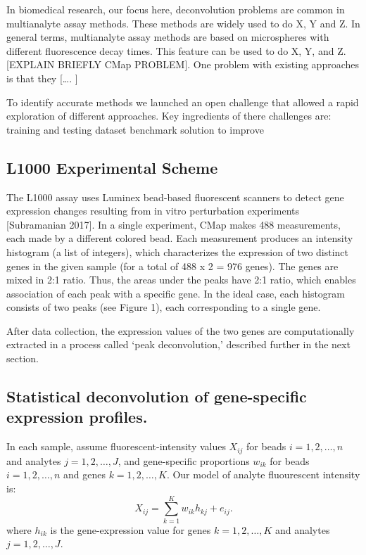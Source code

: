 \documentclass[]{article}
\begin{document}
In biomedical research, our focus here, deconvolution problems are
common in multianalyte assay methods. These methods are widely used to
do X, Y and Z. In general terms, multianalyte assay methods are based on
microspheres with different fluorescence decay times. This feature can
be used to do X, Y, and Z. {[}EXPLAIN BRIEFLY CMap PROBLEM{]}. One
problem with existing approaches is that they {[}\ldots. {]}

To identify accurate methods we launched an open challenge that allowed
a rapid exploration of different approaches. Key ingredients of there
challenges are: training and testing dataset benchmark solution to
improve

\hypertarget{l1000-experimental-scheme}{%
\subsection{L1000 Experimental Scheme}\label{l1000-experimental-scheme}}

The L1000 assay uses Luminex bead-based fluorescent scanners to detect
gene expression changes resulting from in vitro perturbation experiments
{[}Subramanian 2017{]}. In a single experiment, CMap makes 488
measurements, each made by a different colored bead. Each measurement
produces an intensity histogram (a list of integers), which
characterizes the expression of two distinct genes in the given sample
(for a total of 488 x 2 = 976 genes). The genes are mixed in 2:1 ratio.
Thus, the areas under the peaks have 2:1 ratio, which enables
association of each peak with a specific gene. In the ideal case, each
histogram consists of two peaks (see Figure 1), each corresponding to a
single gene.

After data collection, the expression values of the two genes are
computationally extracted in a process called `peak deconvolution,'
described further in the next section.

\hypertarget{statistical-deconvolution-of-gene-specific-expression-profiles.}{%
\subsection{Statistical deconvolution of gene-specific expression
profiles.}\label{statistical-deconvolution-of-gene-specific-expression-profiles.}}

In each sample, assume fluorescent-intensity values \(X_{ij}\) for beads
\(i=1,2,\dots, n\) and analytes \(j=1,2,\dots, J\), and gene-specific
proportions \(w_{ik}\) for beads \(i=1,2,\dots, n\) and genes
\(k=1,2,\dots, K\). Our model of analyte fluourescent intensity is: \[
  X_{ij} = \sum_{k=1}^{K} w_{ik} h_{kj} + e_{ij}. 
\] where \(h_{ik}\) is the gene-expression value for genes
\(k=1,2,\dots, K\) and analytes \(j=1,2,\dots, J\).
\end{document}
